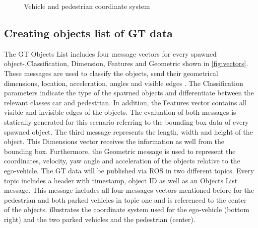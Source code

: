 \begin{figure}[b]
	\centering
	\caption{Vehicle and pedestrian coordinate system \cite{Aeberhard}}
	\label{fig:coordinate}
\end{figure}
\subsection{Creating objects list of \ac{GT} data}\label{B}
The \ac{GT} Objects List includes four message vectors for every spawned object-,Classification, Dimension, Features and Geometric shown in \cref{fig:vectors}. These messages are used to classify the objects, send their geometrical dimensions, location, acceleration, angles and visible edges \cite{Aeberhard}.
The Classification parameters indicate the type of the spawned objects and differentiate between the relevant classes car and pedestrian. In addition, the Features vector contains all visible and invisible edges of the objects. The evaluation of both messages is statically generated for this scenario referring to the bounding box data of every spawned object. The third message represents the length, width and height of the object. This Dimensions vector receives the information as well from the bounding box. Furthermore, the Geometric message is used to represent the coordinates, velocity, yaw angle and acceleration of the objects relative to the ego-vehicle. 
The \ac{GT} data will be published via \ac{ROS} in two different topics. Every topic includes a header with timestamp, object \ac{ID} as well as an Objects List message. This message includes all four messages vectors mentioned before for the pedestrian and both parked vehicles in topic one and is referenced to the center of the objects.  illustrates the coordinate system used for the ego-vehicle (bottom right) and the two parked vehicles and the pedestrian (center). 

